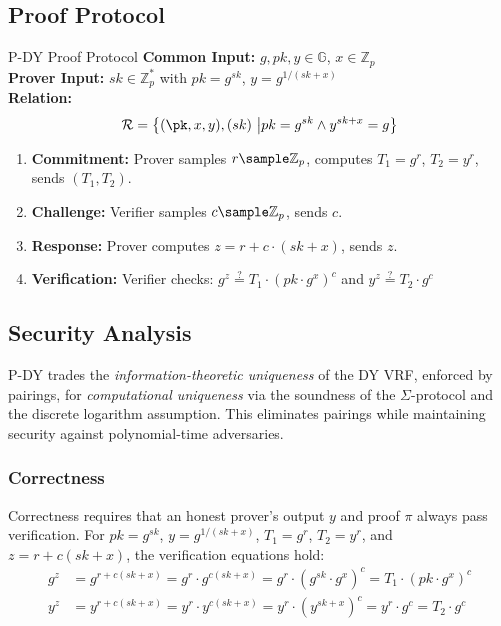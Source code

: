 \subsection{Proof Protocol}
\begin{protocol}{P-DY Proof Protocol}{}\label{protocol-pdy-protocol1}
\textbf{Common Input:} $g, pk, y \in \mathbb{G}$, $x \in \mathbb{Z}_p$ \\
\textbf{Prover Input:} $sk \in \mathbb{Z}_p^*$ with $pk = g^{sk}$, $y = g^{1/(sk + x)}$ \\
\textbf{Relation: }
\[
\mathcal{R} = \left\{ (\pk, x, y), (sk) \ \middle| pk = g^{sk} \land y^{sk + x} = g \right\}
\]
\begin{enumerate}
    \item \textbf{Commitment:} Prover samples $r \sample  \mathbb{Z}_p$, computes $T_1 = g^r$, $T_2 = y^r$, sends $(T_1, T_2)$.
    \item \textbf{Challenge:} Verifier samples $c \sample  \mathbb{Z}_p$, sends $c$.
    \item \textbf{Response:} Prover computes $z = r + c \cdot (sk + x)$, sends $z$.
    \item \textbf{Verification:} Verifier checks: $g^z \stackrel{?}{=} T_1 \cdot (pk \cdot g^x)^c$ and $y^z \stackrel{?}{=} T_2 \cdot g^c$
\end{enumerate}
\end{protocol}

\subsection{Security Analysis}

\begin{remark}
P-DY trades the \emph{information-theoretic uniqueness} of the DY VRF, enforced by pairings, for \emph{computational uniqueness} via the soundness of the $\Sigma$-protocol and the discrete logarithm assumption. This eliminates pairings while maintaining security against polynomial-time adversaries.
\end{remark}

\subsubsection{Correctness}

Correctness requires that an honest prover’s output $y$ and proof $\pi$ always pass verification. For $pk = g^{sk}$, $y = g^{1/(sk + x)}$, $T_1 = g^r$, $T_2 = y^r$, and $z = r + c(sk + x)$, the verification equations hold:
\begin{align*}
g^z &= g^{r + c(sk + x)} = g^r \cdot g^{c(sk + x)} = g^r \cdot (g^{sk} \cdot g^x)^c = T_1 \cdot (pk \cdot g^x)^c \\
y^z &= y^{r + c(sk + x)} = y^r \cdot y^{c(sk + x)} = y^r \cdot (y^{sk + x})^c = y^r \cdot g^c = T_2 \cdot g^c
\end{align*}

